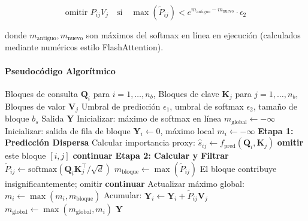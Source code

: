 \[
\text{omitir } P_{ij} V_j \quad \text{si} \quad \max(\tilde{P}_{ij}) < e^{m_{\text{antiguo}} - m_{\text{nuevo}}} \cdot \epsilon_2
\]

donde $m_{\text{antiguo}}, m_{\text{nuevo}}$ son máximos del softmax en línea en ejecución (calculados mediante numéricos estilo FlashAttention).

\paragraph{Pseudocódigo Algorítmico}

\begin{algorithm}[H]
\caption{SpargeAttn: Filtrado Disperso de Dos Etapas por Bloques}
\begin{algorithmic}[1]
\Require Bloques de consulta $\mathbf{Q}_i$ para $i = 1, \ldots, n_b$, Bloques de clave $\mathbf{K}_j$ para $j = 1, \ldots, n_b$, Bloques de valor $\mathbf{V}_j$
\Require Umbral de predicción $\epsilon_1$, umbral de softmax $\epsilon_2$, tamaño de bloque $b_s$
\Ensure Salida $\mathbf{Y}$
\State Inicializar: máximo de softmax en línea $m_{\text{global}} \gets -\infty$
    \State Inicializar: salida de fila de bloque $\mathbf{Y}_i \gets 0$, máximo local $m_i \gets -\infty$
        \State \textbf{Etapa 1: Predicción Dispersa}
        \State Calcular importancia proxy: $\hat{s}_{ij} \gets f_{\text{pred}}(\mathbf{Q}_i, \mathbf{K}_j)$
            \State \textbf{omitir} este bloque $[i,j]$  
            \State \textbf{continuar} 
        \EndIf
        \State \textbf{Etapa 2: Calcular y Filtrar}
        \State $\tilde{P}_{ij} \gets \text{softmax}(\mathbf{Q}_i \mathbf{K}_j^\top / \sqrt{d})$
        \State $m_{\text{bloque}} \gets \max(\tilde{P}_{ij})$
            \State El bloque contribuye insignificantemente; omitir  
            \State \textbf{continuar}
        \EndIf
        \State Actualizar máximo global: $m_i \gets \max(m_i, m_{\text{bloque}})$
        \State Acumular: $\mathbf{Y}_i \gets \mathbf{Y}_i + \tilde{P}_{ij} \mathbf{V}_j$
    \EndFor
    \State $m_{\text{global}} \gets \max(m_{\text{global}}, m_i)$
\EndFor
\Return $\mathbf{Y}$
\end{algorithmic}
\end{algorithm}

